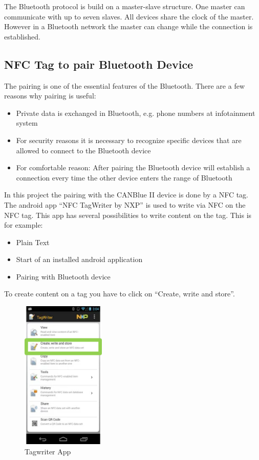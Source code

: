 \documentclass[11pt]{article}
\begin{document}
The Bluetooth protocol is build on a master-slave structure. One master can communicate with up to seven slaves. All devices share the clock of the master. However in a Bluetooth network the master can change while the connection is established.\cite{cite9}

\subsection{NFC Tag to pair Bluetooth Device}

The pairing is one of the essential features of the Bluetooth. There are a few reasons why pairing is useful:
\begin{itemize} 
\item Private data is exchanged in Bluetooth, e.g. phone numbers at infotainment system
\item For security reasons it is necessary to recognize specific devices that are allowed to connect to the Bluetooth device
\item For comfortable reason: After pairing the Bluetooth device will establish a connection every time the other device enters the range of Bluetooth
\end{itemize}

In this project the pairing with the CANBlue II device is done by a NFC tag. The android app "`NFC TagWriter by NXP"' is used to write via NFC on the NFC tag. This app has several possibilities to write content on the tag. This is for example:

\begin{itemize} 
\item Plain Text
\item Start of an installed android application
\item Pairing with Bluetooth device
\end{itemize} 

To create content on a tag you have to click on "`Create, write and store"'.

\begin{figure}[H]

 \centering
 \includegraphics [width=4cm]{tagwriter.png} 
 \caption{Tagwriter App\cite{cite13}}
\end{figure}
\end{document}
